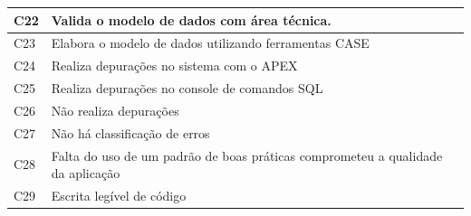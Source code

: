 \begin{longtable}{|M{1.3cm} | m{14.0cm}|}
C22            & Valida o modelo de dados com área técnica.                                                                                                                                                                                                                        \\ \hline
C23            & Elabora o modelo de dados utilizando ferramentas CASE                                                                                                                                                                                                             \\ \hline
C24            & Realiza depurações no sistema com o APEX                                                                                                                                                                                                                          \\ \hline
C25            & Realiza depurações no console de comandos SQL                                                                                                                                                                                                                     \\ \hline
C26            & Não realiza depurações                                                                                                                                                                                                                                            \\ \hline
C27            & Não há classificação de erros                                                                                                                                                                                                                                     \\ \hline
C28            & Falta do uso de um padrão de boas práticas comprometeu a qualidade da aplicação                                                                                                                                                                                   \\ \hline
C29            & Escrita legível de código                                                                                                                                                                                                                                         \\ \hline

\end{longtable}
